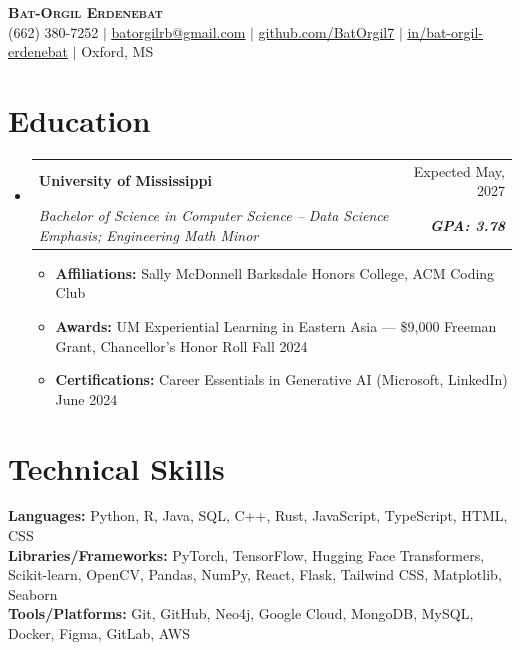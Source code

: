 \documentclass[letterpaper,11pt]{article}
\makeatletter
\newcommand{\resumeItem}[1]{
  \item\small{
    {#1 \vspace{-2pt}}
  }
}
\newcommand{\resumeSubheading}[4]{
  \vspace{-2pt}\item
    \begin{tabular*}{0.97\textwidth}[t]{l@{\extracolsep{\fill}}r}
      \textbf{#1} & #2 \\
      \textit{\small#3} & \textit{\small #4} \\
    \end{tabular*}\vspace{-7pt}
}
\newcommand{\resumeSubHeadingListStart}{\begin{itemize}[leftmargin=0.1in, label={}]}
\newcommand{\resumeSubHeadingListEnd}{\end{itemize}}
\newcommand{\resumeItemListStart}{\begin{itemize}}
\newcommand{\resumeItemListEnd}{\end{itemize}\vspace{-5pt}}
\makeatother
\begin{document}
\begin{center}
    \textbf{\Huge \scshape\textbf{\Large Bat-Orgil Erdenebat }} \\ \vspace{1pt}
    \small (662) 380-7252 $|$ \href{mailto:batorgilrb@gmail.com}{\underline{batorgilrb@gmail.com}} $|$ 
    \href{https://github.com/BatOrgil7}{\underline{github.com/BatOrgil7}} $|$ {\underline{\href{https://linkedin.com/in/bat-orgil-erdenebat}{in/bat-orgil-erdenebat}}} $|$ {{Oxford, MS}}
\end{center}


\section{Education}
  \resumeSubHeadingListStart
    \resumeSubheading
      {University of Mississippi}{Expected May, 2027}
      {Bachelor of Science in Computer Science – Data Science Emphasis; Engineering Math Minor}{\textnormal{\textbf{GPA: 3.78}}} 
      \resumeItemListStart
      \resumeItem{\textbf{Affiliations:} Sally McDonnell Barksdale Honors College, ACM Coding Club}
      \resumeItem{\textbf{Awards:} UM Experiential Learning in Eastern Asia — \$9,000 Freeman Grant, Chancellor's Honor Roll Fall 2024}
      \resumeItem{\textbf{Certifications:} Career Essentials in Generative AI (Microsoft, LinkedIn) June 2024}
    \resumeItemListEnd
  \resumeSubHeadingListEnd
  

\section{Technical Skills}
 \begin{itemize}[leftmargin=0.15in, label={}]
    \small{\item{
     \textbf{Languages:} Python, R, Java, SQL, C++, Rust, JavaScript, TypeScript, HTML, CSS \\
     \textbf{Libraries/Frameworks:} PyTorch, TensorFlow, Hugging Face Transformers, Scikit-learn, OpenCV, Pandas, NumPy, React, Flask, Tailwind CSS, Matplotlib, Seaborn \\
     \textbf{Tools/Platforms:} Git, GitHub, Neo4j, Google Cloud, MongoDB, MySQL, Docker, Figma, GitLab, AWS
    }}
 \end{itemize}

\end{document}

